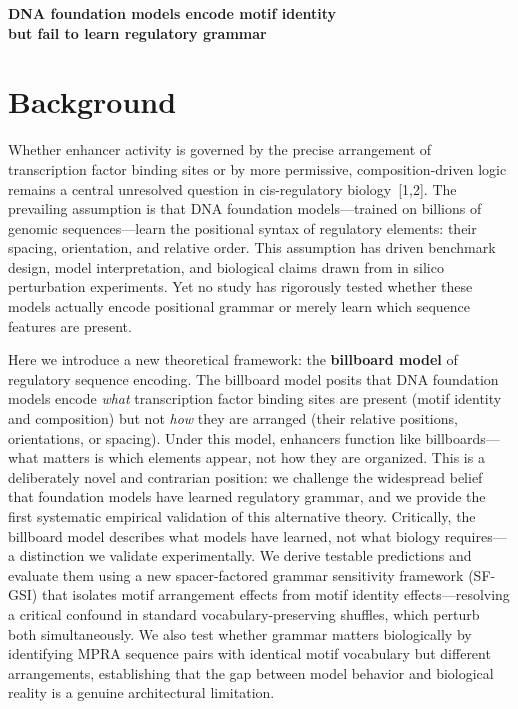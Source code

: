 \documentclass[10pt]{article}
\begin{document}
\begin{center}
{\Large\bfseries DNA foundation models encode motif identity\\[2pt] but fail to learn regulatory grammar}
\vspace{5pt}
\end{center}

\section*{Background}

Whether enhancer activity is governed by the precise arrangement of transcription factor binding sites or by more permissive, composition-driven logic remains a central unresolved question in cis-regulatory biology~[1,2].
The prevailing assumption is that DNA foundation models---trained on billions of genomic sequences---learn the positional syntax of regulatory elements: their spacing, orientation, and relative order.
This assumption has driven benchmark design, model interpretation, and biological claims drawn from in silico perturbation experiments.
Yet no study has rigorously tested whether these models actually encode positional grammar or merely learn which sequence features are present.

Here we introduce a new theoretical framework: the \textbf{billboard model} of regulatory sequence encoding.
The billboard model posits that DNA foundation models encode \textit{what} transcription factor binding sites are present (motif identity and composition) but not \textit{how} they are arranged (their relative positions, orientations, or spacing).
Under this model, enhancers function like billboards---what matters is which elements appear, not how they are organized.
This is a deliberately novel and contrarian position: we challenge the widespread belief that foundation models have learned regulatory grammar, and we provide the first systematic empirical validation of this alternative theory.
Critically, the billboard model describes what models have learned, not what biology requires---a distinction we validate experimentally.
We derive testable predictions and evaluate them using a new spacer-factored grammar sensitivity framework (SF-GSI) that isolates motif arrangement effects from motif identity effects---resolving a critical confound in standard vocabulary-preserving shuffles, which perturb both simultaneously.
We also test whether grammar matters biologically by identifying MPRA sequence pairs with identical motif vocabulary but different arrangements, establishing that the gap between model behavior and biological reality is a genuine architectural limitation.
\end{document}
